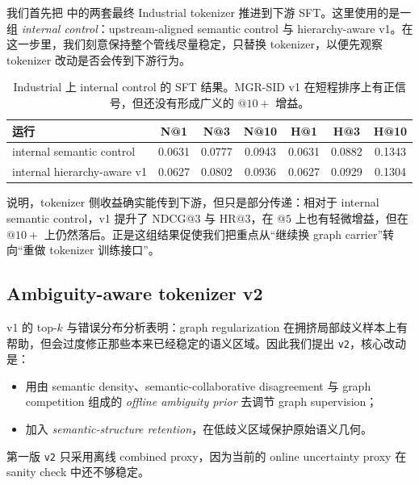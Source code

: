 我们首先把  中的两套最终 Industrial tokenizer 推进到下游 SFT。这里使用的是一组 \emph{internal control}：upstream-aligned semantic control 与 hierarchy-aware v1。在这一步里，我们刻意保持整个管线尽量稳定，只替换 tokenizer，以便先观察 tokenizer 改动是否会传到下游行为。

\begin{table}[t]
  \centering
  \caption{Industrial 上 internal control 的 SFT 结果。MGR-SID v1 在短程排序上有正信号，但还没有形成广义的 $@10+$ 增益。}
  \label{tab:sft_v1}
  \begin{tabular}{lcccccc}
    \toprule
    运行 & N@1 & N@3 & N@10 & H@1 & H@3 & H@10 \\
    \midrule
    internal semantic control & 0.0631 & 0.0777 & 0.0943 & 0.0631 & 0.0882 & 0.1343 \\
    internal hierarchy-aware v1 & 0.0627 & 0.0802 & 0.0936 & 0.0627 & 0.0929 & 0.1304 \\
    \bottomrule
  \end{tabular}
\end{table}

 说明，tokenizer 侧收益确实能传到下游，但只是部分传递：相对于 internal semantic control，v1 提升了 $\mathrm{NDCG}@3$ 与 $\mathrm{HR}@3$，在 $@5$ 上也有轻微增益，但在 $@10+$ 上仍然落后。正是这组结果促使我们把重点从“继续换 graph carrier”转向“重做 tokenizer 训练接口”。

\subsection{Ambiguity-aware tokenizer v2}

v1 的 top-$k$ 与错误分布分析表明：graph regularization 在拥挤局部歧义样本上有帮助，但会过度修正那些本来已经稳定的语义区域。因此我们提出 \texttt{v2}，核心改动是：
\begin{itemize}[leftmargin=1.4em]
  \item 用由 semantic density、semantic-collaborative disagreement 与 graph competition 组成的 \emph{offline ambiguity prior} 去调节 graph supervision；
  \item 加入 \emph{semantic-structure retention}，在低歧义区域保护原始语义几何。
\end{itemize}

第一版 \texttt{v2} 只采用离线 combined proxy，因为当前的 online uncertainty proxy 在 sanity check 中还不够稳定。

